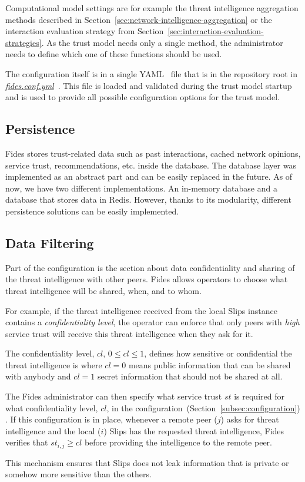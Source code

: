 Computational model settings are for example the threat intelligence aggregation methods described in Section~\ref{sec:network-intelligence-aggregation} or the interaction evaluation strategy from Section~\ref{sec:interaction-evaluation-strategies}.
As the trust model needs only a single method, the administrator needs to define which one of these functions should be used.

The configuration itself is in a single YAML~\cite{yaml} file that is in the repository root in \href{https://github.com/LukasForst/fides/blob/master/fides.conf.yml}{\textit{fides.conf.yml}}~\cite{fidesGithub}.
This file is loaded and validated during the trust model startup and is used to provide all possible configuration options for the trust model.

\subsection{Persistence}
\label{subsec:persistence}
Fides stores trust-related data such as past interactions, cached network opinions, service trust, recommendations, etc. inside the database.
The database layer was implemented as an abstract part and can be easily replaced in the future.
As of now, we have two different implementations. An in-memory database and a database that stores data in Redis.
However, thanks to its modularity, different persistence solutions can be easily implemented.

\subsection{Data Filtering}
\label{subsec:data-filtering}
Part of the configuration is the section about data confidentiality and sharing of the threat intelligence with other peers.
Fides allows operators to choose what threat intelligence will be shared, when, and to whom.

For example, if the threat intelligence received from the local Slips instance contains a \textit{confidentiality level}, the operator can enforce that only peers with \textit{high} service trust will receive this threat intelligence when they ask for it.

The confidentiality level, $cl$, $0 \leq cl \leq 1$, defines how sensitive or confidential the threat intelligence is where $cl = 0$ means public information that can be shared with anybody and $cl = 1$ secret information that should not be shared at all.

The Fides administrator can then specify what service trust $st$ is required for what confidentiality level, $cl$, in the configuration~(Section~\ref{subsec:configuration}) .
If this configuration is in place, whenever a remote peer ($j$) asks for threat intelligence and the local ($i$) Slips has the requested threat intelligence, Fides verifies that $st_{i, j} \geq cl$ before providing the intelligence to the remote peer.

This mechanism ensures that Slips does not leak information that is private or somehow more sensitive than the others.